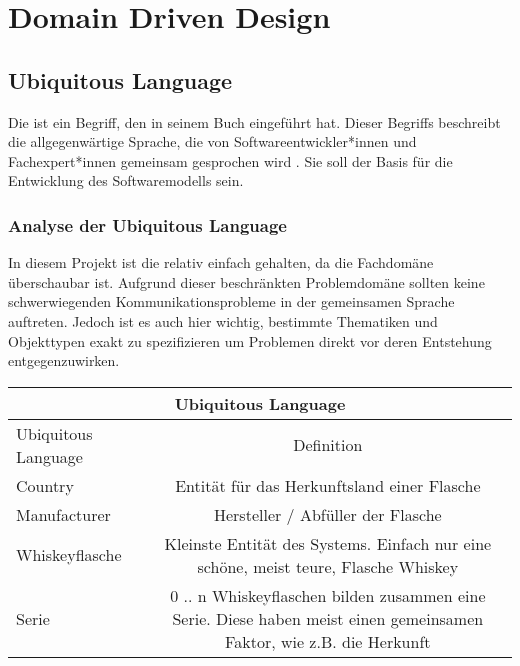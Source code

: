 
\chapter{Domain Driven Design}
	

	\section{Ubiquitous Language}
	Die  ist ein Begriff, den \citeauthor{evans2004ddd} in seinem Buch  eingeführt hat. Dieser Begriffs beschreibt die allgegenwärtige Sprache, die von Softwareentwickler*innen und Fachexpert*innen gemeinsam gesprochen wird \cite{ubiquitousLanguage.entwicklerDE}. Sie soll der Basis für die Entwicklung des Softwaremodells sein.
	
		\subsection{Analyse der Ubiquitous Language}
		In diesem Projekt ist die  relativ einfach gehalten, da die Fachdomäne überschaubar ist. Aufgrund dieser beschränkten Problemdomäne sollten keine schwerwiegenden Kommunikationsprobleme in der gemeinsamen Sprache auftreten. Jedoch ist es auch hier wichtig, bestimmte Thematiken und Objekttypen exakt zu spezifizieren um Problemen direkt vor deren Entstehung entgegenzuwirken.
		
		\begin{table}[ht]
			\begin{adjustbox}{width=1\textwidth}
				\begin{tabular}{|l|c|}
					\hline
					\multicolumn{2}{|c|}{Ubiquitous Language} \\
					\hline
					Ubiquitous Language			&		\hk{normale} Definition \\
					\hline
					\hline
					Country						& 		Entität für das Herkunftsland einer Flasche \\
					\hline
					Manufacturer				& 		Hersteller / Abfüller der Flasche \\
					\hline
					Whiskeyflasche				&		Kleinste Entität des Systems. Einfach nur eine schöne, meist teure, Flasche Whiskey \\
					\hline
					Serie						&		0 .. n Whiskeyflaschen bilden zusammen eine Serie. Diese haben meist einen gemeinsamen Faktor, wie z.B. die Herkunft \\
					\hline
				\end{tabular}
			\end{adjustbox}
		\end{table}
	
